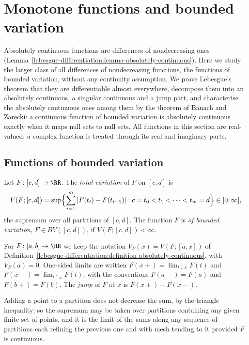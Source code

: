 \section{Monotone functions and bounded variation}\label{lebesgue-differentiation:section-bounded-variation}

Absolutely continuous functions are differences of nondecreasing ones
(Lemma~\ref{lebesgue-differentiation:lemma-absolutely-continuous}). Here we study the larger class of all differences of nondecreasing functions, the functions of bounded variation, without any
continuity assumption. We prove Lebesgue's theorem that they are differentiable almost everywhere, decompose them into an absolutely continuous, a singular continuous and a jump part, and characterise
the absolutely continuous ones among them by the theorem of Banach and Zarecki: a continuous function of bounded variation is absolutely continuous exactly when it maps null sets to null sets. All
functions in this section are real-valued; a complex function is treated through its real and imaginary parts.

\subsection{Functions of bounded variation}\label{lebesgue-differentiation:subsection-bv}

\begin{definition}\label{lebesgue-differentiation:definition-bounded-variation}
Let $F \colon [c, d] \to \RR$. The \emph{total variation} of $F$ on $[c, d]$ is
\[
V(F; [c, d]) = \sup\Bigl\{\sum_{i=1}^m|F(t_i) - F(t_{i-1})| : c = t_0 < t_1 < \cdots < t_m = d\Bigr\} \in [0, \infty],
\]
the supremum over all partitions of $[c, d]$. The function $F$ is \emph{of bounded variation}, $F \in BV([c, d])$, if $V(F; [c, d]) < \infty$.
\end{definition}

\begin{notation}\label{lebesgue-differentiation:notation-bounded-variation}
For $F \colon [a, b] \to \RR$ we keep the notation $V_F(x) = V(F; [a, x])$ of Definition~\ref{lebesgue-differentiation:definition-absolutely-continuous}, with $V_F(a) = 0$. One-sided limits are
written $F(x+) = \lim_{t \downarrow x}F(t)$ and $F(x-) = \lim_{t \uparrow x}F(t)$, with the conventions $F(a-) = F(a)$ and $F(b+) = F(b)$. The \emph{jump} of $F$ at $x$ is $F(x+) - F(x-)$.
\end{notation}

Adding a point to a partition does not decrease the sum, by the triangle inequality; so the supremum may be taken over partitions containing any given finite set of points, and it is the
limit of the sums along any sequence of partitions each refining the previous one and with mesh tending to $0$, provided $F$ is continuous.

